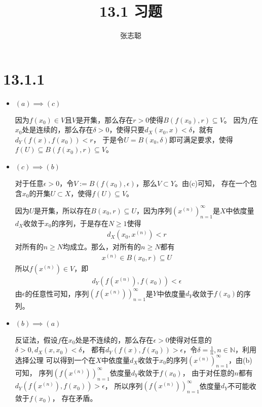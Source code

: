 \documentclass{article}
\begin{document}
\title{13.1 习题}
\author{张志聪}
\maketitle

\section*{13.1.1}

\begin{itemize}
  \item $(a) \implies (c)$

        因为$f(x_0) \in V$且$V$是开集，那么存在$r > 0$使得$B(f(x_0), r) \subseteq V$。
        因为$f$在$x_0$处是连续的，那么存在$\delta > 0$，使得只要$d_X(x_0, x) < \delta$，就有
        $d_Y(f(x), f(x_0)) < r$，
        于是令$U = B(x_0, \delta)$即可满足要求，使得$f(U) \subseteq B(f(x_0), r) \subseteq V$。

  \item $(c) \implies (b)$

        对于任意$\epsilon > 0$，令$V := B(f(x_0), \epsilon)$，那么$V \subset Y$。由(c)可知，
        存在一个包含$x_0$的开集$U \subset X$，使得$f(U) \subseteq V$。

        因为$U$是开集，所以存在$B(x_0, r) \subseteq U$，因为序列$(x^{(n)})_{n = 1}^\infty$是$X$中依度量
        $d_X$收敛于$x_0$的序列，于是存在$N \geq 1$使得
        \begin{align*}
          d_X(x_0, x^{(n)}) < r
        \end{align*}
        对所有的$n \geq N$均成立。那么，对所有的$n \geq N$都有
        \begin{align*}
          x^{(n)} \in B(x_0, r) \subseteq U
        \end{align*}
        所以$f(x^{(n)}) \in V$，即
        \begin{align*}
          d_Y(f(x^{(n)}), f(x_0)) < \epsilon
        \end{align*}
        由$\epsilon$的任意性可知，序列$(f(x^{(n)}))_{n = 1}^\infty$是$Y$中依度量$d_Y$收敛于$f(x_0)$的序列。

  \item $(b) \implies (a)$

        反证法，假设$f$在$x_0$处是不连续的，那么存在$\epsilon > 0$使得对任意的$\delta > 0, d_X(x, x_0) < \delta$，
        都有$d_Y(f(x), f(x_0)) > \epsilon$，令$\delta = \frac{1}{n}, n \in \mathbb{N}$，利用选择公理
        可以得到一个在$X$中依度量$d_X$收敛于$x_0$的序列$(x^{(n)})_{n = 1}^\infty$，由(b)可知，
        序列$(f(x^{(n)}))_{n = 1}^\infty$依度量$d_Y$收敛于$f(x_0)$，
        由于对任意的$n$都有$d_Y(f(x^{(n)}), f(x_0)) > \epsilon$，
        所以序列$(f(x^{(n)}))_{n = 1}^\infty$依度量$d_Y$不可能收敛于$f(x_0)$，
        存在矛盾。
\end{itemize}
\end{document}
